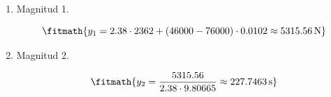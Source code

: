 \begin{enumerate}

\item Magnitud 1.

\[\fitmath{y_{1}=2.38\cdot 2362+\left(46000-76000\right)\cdot 0.0102\approx 5315.56\,\mathrm{N}}\]

\item Magnitud 2.

\[\fitmath{y_{2}=\frac{5315.56}{2.38\cdot 9.80665}\approx 227.7463\,\mathrm{s}}\]

\end{enumerate}
